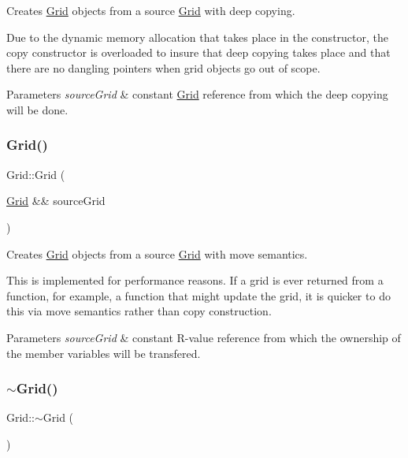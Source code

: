Creates \hyperlink{class_grid}{Grid} objects from a source \hyperlink{class_grid}{Grid} with deep copying. 

Due to the dynamic memory allocation that takes place in the constructor, the copy constructor is overloaded to insure that deep copying takes place and that there are no dangling pointers when grid objects go out of scope.


\begin{DoxyParams}{Parameters}
{\em source\+Grid} & constant \hyperlink{class_grid}{Grid} reference from which the deep copying will be done. \\
\hline
\end{DoxyParams}
\mbox{\label{class_grid_a3828d0bf34f6c97ed93adc84d4ce6c4b}} 
\subsubsection{\texorpdfstring{Grid()}{Grid()}\hspace{0.1cm}{\footnotesize\ttfamily [5/5]}}
{\footnotesize\ttfamily Grid\+::\+Grid (\begin{DoxyParamCaption}\item[{\hyperlink{class_grid}{Grid} \&\&}]{source\+Grid }\end{DoxyParamCaption})}



Creates \hyperlink{class_grid}{Grid} objects from a source \hyperlink{class_grid}{Grid} with move semantics. 

This is implemented for performance reasons. If a grid is ever returned from a function, for example, a function that might update the grid, it is quicker to do this via move semantics rather than copy construction.


\begin{DoxyParams}{Parameters}
{\em source\+Grid} & constant R-\/value reference from which the ownership of the member variables will be transfered. \\
\hline
\end{DoxyParams}
\mbox{\label{class_grid_a3661d0a7f998caaaf8627d7a67072116}} 
\subsubsection{\texorpdfstring{$\sim$\+Grid()}{~Grid()}}
{\footnotesize\ttfamily Grid\+::$\sim$\+Grid (\begin{DoxyParamCaption}{ }\end{DoxyParamCaption})}



